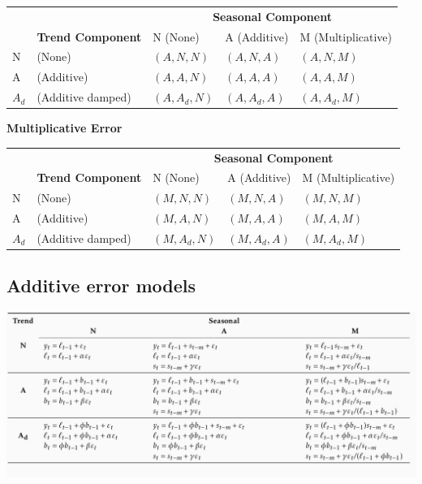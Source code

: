 \documentclass[]{book}
\begin{document}
\begin{table}[h]
\begin{tabular}{lllll}
 &                         & \multicolumn{3}{c}{\textbf{Seasonal Component}} \\
      & \textbf{Trend Component} & N (None)  & A (Additive)  & M (Multiplicative)  \\
N     &    (None)                      &  $(A,N,N)$          &  $(A,N,A)$              &       $(A,N,M)$               \\
A     &     (Additive)                     &  $(A,A,N)$          &     $(A,A,A)$          &         $(A,A,M)$              \\
$A_d$ &  (Additive damped)                         &       $(A,A_d,N)$    &      $(A,A_d,A)$          &    $(A,A_d,M)$                 
\end{tabular}
\end{table}

\textbf{Multiplicative Error}

\begin{table}[h]
\begin{tabular}{lllll}
  &                       & \multicolumn{3}{c}{\textbf{Seasonal Component}} \\
      & \textbf{Trend Component} & N (None)  & A (Additive)  & M (Multiplicative)  \\
N     &    (None)                      &  $(M,N,N)$          &  $(M,N,A)$              &       $(M,N,M)$               \\
A     &     (Additive)                     &  $(M,A,N)$          &     $(M,A,A)$          &         $(M,A,M)$              \\
$A_d$ &  (Additive damped)                         &       $(M,A_d,N)$    &      $(M,A_d,A)$          &    $(M,A_d,M)$                 
\end{tabular}
\end{table}

\hypertarget{additive-error-models}{%
\subsection{Additive error models}\label{additive-error-models}}

\includegraphics[width=1\textwidth,height=1\textheight]{fig/fig_7_ets_add.png}
\end{document}

